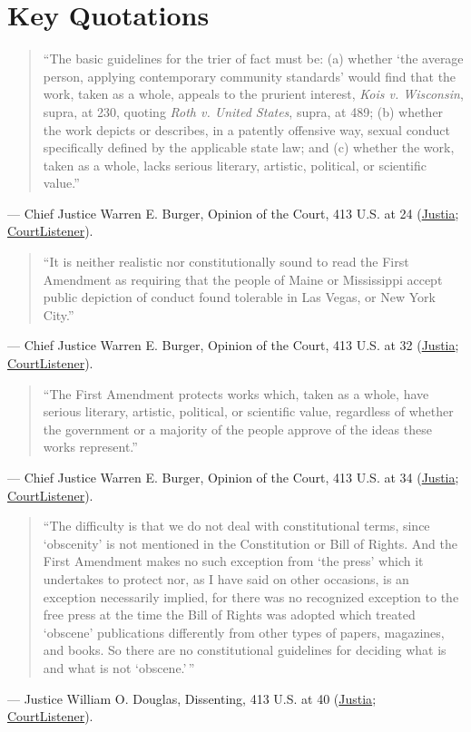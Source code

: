 \documentclass[12pt]{article}
\begin{document}
\section{Key Quotations}
\begin{quote}
``The basic guidelines for the trier of fact must be: (a) whether `the average person, applying contemporary community standards' would find that the work, taken as a whole, appeals to the prurient interest, \textit{Kois v. Wisconsin}, supra, at 230, quoting \textit{Roth v. United States}, supra, at 489; (b) whether the work depicts or describes, in a patently offensive way, sexual conduct specifically defined by the applicable state law; and (c) whether the work, taken as a whole, lacks serious literary, artistic, political, or scientific value.''
\end{quote}
\noindent --- Chief Justice Warren E. Burger, Opinion of the Court, 413 U.S. at 24 (\href{https://supreme.justia.com/cases/federal/us/413/15/}{Justia}; \href{https://www.courtlistener.com/opinion/108838/miller-v-california/}{CourtListener}).

\begin{quote}
``It is neither realistic nor constitutionally sound to read the First Amendment as requiring that the people of Maine or Mississippi accept public depiction of conduct found tolerable in Las Vegas, or New York City.''
\end{quote}
\noindent --- Chief Justice Warren E. Burger, Opinion of the Court, 413 U.S. at 32 (\href{https://supreme.justia.com/cases/federal/us/413/15/}{Justia}; \href{https://www.courtlistener.com/opinion/108838/miller-v-california/}{CourtListener}).

\begin{quote}
``The First Amendment protects works which, taken as a whole, have serious literary, artistic, political, or scientific value, regardless of whether the government or a majority of the people approve of the ideas these works represent.''
\end{quote}
\noindent --- Chief Justice Warren E. Burger, Opinion of the Court, 413 U.S. at 34 (\href{https://supreme.justia.com/cases/federal/us/413/15/}{Justia}; \href{https://www.courtlistener.com/opinion/108838/miller-v-california/}{CourtListener}).

\begin{quote}
``The difficulty is that we do not deal with constitutional terms, since `obscenity' is not mentioned in the Constitution or Bill of Rights. And the First Amendment makes no such exception from `the press' which it undertakes to protect nor, as I have said on other occasions, is an exception necessarily implied, for there was no recognized exception to the free press at the time the Bill of Rights was adopted which treated `obscene' publications differently from other types of papers, magazines, and books. So there are no constitutional guidelines for deciding what is and what is not `obscene.'\,''
\end{quote}
\noindent --- Justice William O. Douglas, Dissenting, 413 U.S. at 40 (\href{https://supreme.justia.com/cases/federal/us/413/15/}{Justia}; \href{https://www.courtlistener.com/opinion/108838/miller-v-california/}{CourtListener}).
\end{document}
